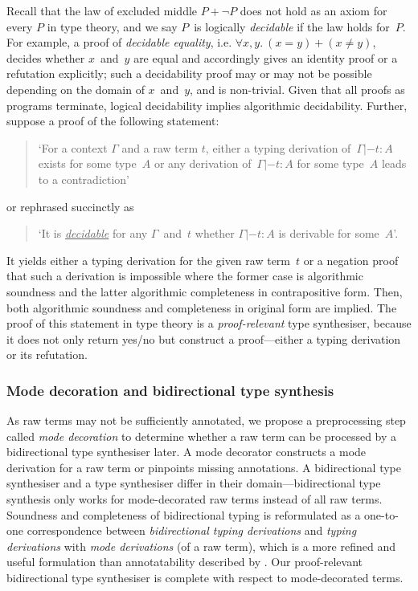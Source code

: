 Recall that the law of excluded middle $P + \neg P$ does not hold as an axiom for every $P$ in type theory, and we say $P$~is logically \emph{decidable} if the law holds for~$P$.
For example, a proof of \emph{decidable equality}, i.e. $\forall x, y.~(x = y) + (x \neq y)$, decides whether $x$~and~$y$ are equal and accordingly gives an identity proof or a refutation explicitly; such a decidability proof may or may not be possible depending on the domain of $x$~and~$y$, and is non-trivial.
Given that all proofs as programs terminate, logical decidability implies algorithmic decidability.
Further, suppose a proof of the following statement:
\begin{quote}
  `For a context $\Gamma$ and a raw term $t$, either a typing derivation of\, $\Gamma |- t : A$ exists for some type~$A$ or any derivation of\, $\Gamma |- t : A$ for some type~$A$ leads to a contradiction'
\end{quote}
or rephrased succinctly as 
\begin{quote}
  `It is \underline{\emph{decidable}} for any $\Gamma$~and~$t$ whether $\Gamma |- t : A$ is derivable for some~$A$'.
\end{quote}
It yields either a typing derivation for the given raw term~$t$ or a negation proof that such a derivation is impossible where the former case is algorithmic soundness and the latter algorithmic completeness in contrapositive form.
Then, both algorithmic soundness and completeness in original form are implied.
The proof of this statement in type theory is a \emph{proof-relevant} type synthesiser, because it does not only return yes/no but construct a proof---either a typing derivation or its refutation. 

\subsubsection{Mode decoration and bidirectional type synthesis}
As raw terms may not be sufficiently annotated, we propose a preprocessing step called \emph{mode decoration} to determine whether a raw term can be processed by a bidirectional type synthesiser later.
A mode decorator constructs a mode derivation for a raw term or pinpoints missing annotations.
A bidirectional type synthesiser and a type synthesiser differ in their domain---bidirectional type synthesis only works for mode-decorated raw terms instead of all raw terms.
Soundness and completeness of bidirectional typing is reformulated as a one-to-one correspondence between \emph{bidirectional typing derivations} and \emph{typing derivations} with \emph{mode derivations} (of a raw term), which is a more refined and useful formulation than annotatability described by \citet[Section~3.2]{Dunfield2021}.
Our proof-relevant bidirectional type synthesiser is complete with respect to mode-decorated terms.

